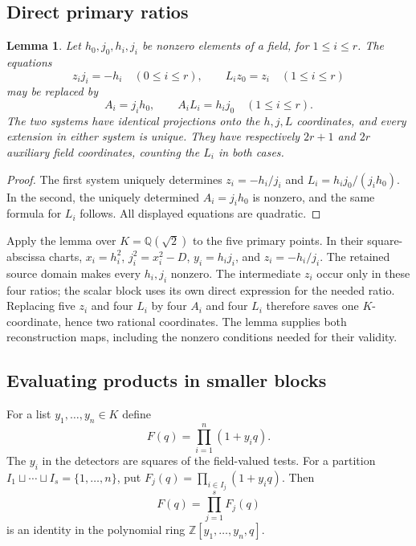 \documentclass[11pt,a4paper]{article}
\newtheorem{lemma}[theorem]{Lemma}
\theoremstyle{definition}
\theoremstyle{remark}
\begin{document}
\subsection{Direct primary ratios}

\begin{lemma}\label{lem:direct-primary-ratios}
Let $h_0,j_0,h_i,j_i$ be nonzero elements of a field, for
$1\le i\le r$. The equations
\[
 z_i j_i=-h_i\quad(0\le i\le r),\qquad
 L_i z_0=z_i\quad(1\le i\le r)
\]
may be replaced by
\[
 A_i=j_i h_0,\qquad A_iL_i=h_i j_0\quad(1\le i\le r).
\]
The two systems have identical projections onto the $h,j,L$
coordinates, and every extension in either system is unique.
They have respectively $2r+1$ and $2r$ auxiliary field coordinates,
counting the $L_i$ in both cases.
\end{lemma}
\begin{proof}
The first system uniquely determines $z_i=-h_i/j_i$ and
$L_i=h_i j_0/(j_i h_0)$. In the second, the uniquely determined
$A_i=j_i h_0$ is nonzero, and the same formula for $L_i$ follows.
All displayed equations are quadratic.
\end{proof}

Apply the lemma over $K=\mathbb Q(\sqrt2)$ to the five primary
points. In their square-abscissa charts,
$x_i=h_i^2$, $j_i^2=x_i^2-D$, $y_i=h_i j_i$, and
$z_i=-h_i/j_i$. The retained source domain makes every $h_i,j_i$
nonzero. The intermediate $z_i$ occur only in these four ratios;
the scalar block uses its own direct expression for the needed ratio.
Replacing five $z_i$ and four $L_i$ by four $A_i$ and four $L_i$
therefore saves one $K$-coordinate, hence two rational coordinates.
The lemma supplies both reconstruction maps, including the nonzero
conditions needed for their validity.

\subsection{Evaluating products in smaller blocks}

For a list $y_1,\ldots,y_n\in K$ define
\[
                         F(q)=\prod_{i=1}^{n}(1+y_iq).
\]
The $y_i$ in the detectors are squares of the field-valued tests.
For a partition $I_1\sqcup\cdots\sqcup I_s=\{1,\ldots,n\}$,
put $F_j(q)=\prod_{i\in I_j}(1+y_iq)$. Then
\begin{equation}\label{eq:block-product-identity}
                         F(q)=\prod_{j=1}^{s}F_j(q)
\end{equation}
is an identity in the polynomial ring
$\mathbb Z[y_1,\ldots,y_n,q]$.
\end{document}
